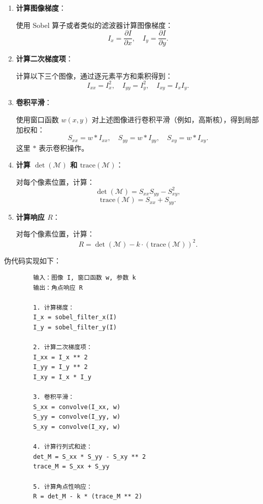 \documentclass[UTF8]{ctexart}
\begin{document}
	\begin{enumerate}
		\item \textbf{计算图像梯度}：
		
		使用 Sobel 算子或者类似的滤波器计算图像梯度：
		\[
		I_x = \frac{\partial I}{\partial x}, \quad I_y = \frac{\partial I}{\partial y}.
		\]
		
		\item \textbf{计算二次梯度项}：
		
		计算以下三个图像，通过逐元素平方和乘积得到：
		\[
		I_{xx} = I_x^2, \quad I_{yy} = I_y^2, \quad I_{xy} = I_x I_y.
		\]
		
		\item \textbf{卷积平滑}：
		
		使用窗口函数 \(w(x, y)\) 对上述图像进行卷积平滑（例如，高斯核），得到局部加权和：
		\[
		S_{xx} = w * I_{xx}, \quad S_{yy} = w * I_{yy}, \quad S_{xy} = w * I_{xy}.
		\]
		这里 \(*\) 表示卷积操作。
		
		\item \textbf{计算 \(\det(\mathcal{M})\) 和 \(\text{trace}(\mathcal{M})\)}：
		
		对每个像素位置，计算：
		\[
		\det(\mathcal{M}) = S_{xx} S_{yy} - S_{xy}^2,
		\]
		\[
		\text{trace}(\mathcal{M}) = S_{xx} + S_{yy}.
		\]
		
		\item \textbf{计算响应 \(R\)}：
		
		对每个像素位置，计算：
		\[
		R = \det(\mathcal{M}) - k \cdot (\text{trace}(\mathcal{M}))^2.
		\]
	\end{enumerate}
	
	伪代码实现如下：
	\begin{verbatim}
		输入：图像 I, 窗口函数 w, 参数 k
		输出：角点响应 R
		
		1. 计算梯度：
		I_x = sobel_filter_x(I)
		I_y = sobel_filter_y(I)
		
		2. 计算二次梯度项：
		I_xx = I_x ** 2
		I_yy = I_y ** 2
		I_xy = I_x * I_y
		
		3. 卷积平滑：
		S_xx = convolve(I_xx, w)
		S_yy = convolve(I_yy, w)
		S_xy = convolve(I_xy, w)
		
		4. 计算行列式和迹：
		det_M = S_xx * S_yy - S_xy ** 2
		trace_M = S_xx + S_yy
		
		5. 计算角点性响应：
		R = det_M - k * (trace_M ** 2)
	\end{verbatim}

	

	
	
\end{document}
